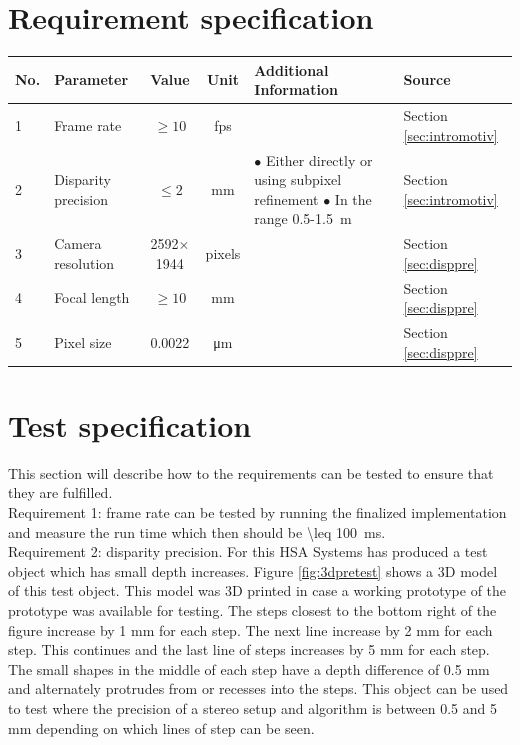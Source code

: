 \section{Requirement specification}
\begin{table}[ht!]
  \centering
  \begin{tabular}{l l c c p{4cm} p{2.5cm}}
  \toprule
  \textbf{No.} & \textbf{Parameter} & \textbf{Value} & \textbf{Unit} & \textbf{Additional Information} & \textbf{Source} \\
  \midrule
  1 & Frame rate & $\geq 10$ & fps & & Section \vref{sec:intromotiv} \\
  \midrule
  2 & Disparity precision & $\leq 2$ & mm & $\bullet$ Either directly or using subpixel refinement \newline $\bullet$ In the range 0.5-\SI{1.5}{\meter} & Section \vref{sec:intromotiv}\\
  \midrule
  3 & Camera resolution & 2592$\times$1944 & pixels & & Section \vref{sec:disppre} \\
  \midrule
  4 & Focal length & $\geq 10$ & mm & & Section \vref{sec:disppre} \\
  \midrule
  5 & Pixel size & 0.0022 & \si{\micro\meter} & & Section \vref{sec:disppre} \\  
  \bottomrule
  \end{tabular}
\end{table}
\section{Test specification}
This section will describe how to the requirements can be tested to ensure that they are fulfilled. \\

Requirement 1: frame rate can be tested by running the finalized implementation and measure the run time which then should be \SI{\leq 100}{\milli\second}. \\

Requirement 2: disparity precision. For this HSA Systems has produced a test object which has small depth increases. Figure \vref{fig:3dpretest} shows a 3D model of this test object. This model was 3D printed in case a working prototype of the prototype was available for testing. The steps closest to the bottom right of the figure increase by 1 mm for each step. The next line increase by 2 mm for each step. This continues and the last line of steps increases by 5 mm for each step. The small shapes in the middle of each step have a depth difference of 0.5 mm and alternately protrudes from or recesses into the steps. This object can be used to test where the precision of a stereo setup and algorithm is between 0.5 and 5 mm depending on which lines of step can be seen. \\

